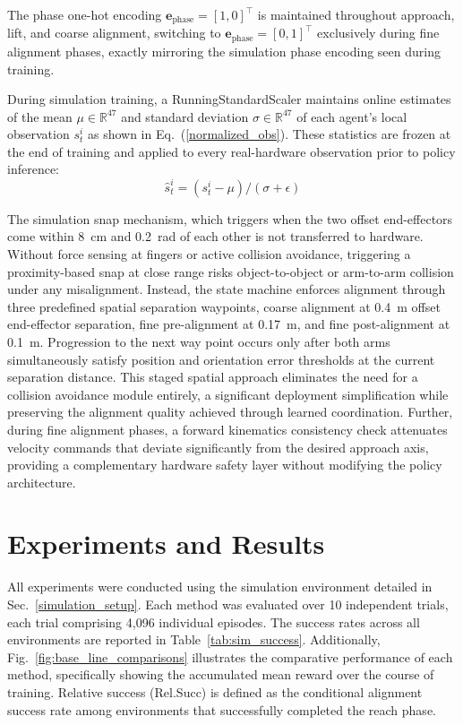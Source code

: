 \documentclass[a4paper,fleqn]{cas-dc}
\begin{document}
The phase one-hot encoding $\mathbf{e}_{\text{phase}} = [1, 0]^\top$ is maintained throughout approach, lift, and coarse alignment, switching to $\mathbf{e}_{\text{phase}} = [0, 1]^\top$ exclusively during fine alignment phases, exactly mirroring the simulation phase encoding seen during training.

During simulation training, a RunningStandardScaler maintains online estimates of the mean $\mu \in \mathbb{R}^{47}$ and standard deviation $\sigma \in \mathbb{R}^{47}$ of each agent's local observation $s_t^i$ as shown in Eq.~(\ref{normalized_obs}). These statistics are frozen at the end of training and applied to every real-hardware observation prior to policy inference:
\begin{equation}
    \hat{s}^{i}_{t} = (s^{i}_{t} - \mu)/(\sigma + \epsilon)
    \label{normalized_obs}
\end{equation}

The simulation snap mechanism, which triggers when the two offset end-effectors come within 8~cm and 0.2~rad of each other is not transferred to hardware. Without force sensing at fingers or active collision avoidance, triggering a proximity-based snap at close range risks object-to-object or arm-to-arm collision under any misalignment. Instead, the state machine enforces alignment through three predefined spatial separation waypoints, coarse alignment at 0.4~m offset end-effector separation, fine pre-alignment at 0.17~m, and fine post-alignment at 0.1~m. Progression to the next way point occurs only after both arms simultaneously satisfy position and orientation error thresholds at the current separation distance. This staged spatial approach eliminates the need for a collision avoidance module entirely, a significant deployment simplification while preserving the alignment quality achieved through learned coordination. Further, during fine alignment phases, a forward kinematics consistency check attenuates velocity commands that deviate significantly from the desired approach axis, providing a complementary hardware safety layer without modifying the policy architecture.

\section{Experiments and Results}
\label{results_and_discussion}
All experiments were conducted using the simulation environment detailed in Sec.~\ref{simulation_setup}. Each method was evaluated over 10 independent trials, each trial comprising 4,096 individual episodes. The success rates across all environments are reported in Table~\ref{tab:sim_success}. Additionally, Fig.~\ref{fig:base_line_comparisons} illustrates the comparative performance of each method, specifically showing the accumulated mean reward over the course of training. Relative success (Rel.Succ) is defined as the conditional alignment success rate among environments that successfully completed the reach phase.
\end{document}
